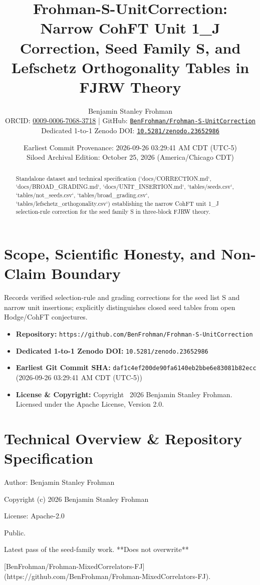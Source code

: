 \documentclass[11pt,a4paper]{article}
\title{\textbf{Frohman-S-UnitCorrection: Narrow CohFT Unit 1\_J Correction, Seed Family S, and Lefschetz Orthogonality Tables in FJRW Theory}}
\author{Benjamin Stanley Frohman\\
\small ORCID: \href{https://orcid.org/0009-0006-7068-3718}{0009-0006-7068-3718} \quad|\quad
GitHub: \href{https://github.com/BenFrohman/Frohman-S-UnitCorrection}{\texttt{BenFrohman/Frohman-S-UnitCorrection}}\\
\small Dedicated 1-to-1 Zenodo DOI: \href{https://doi.org/10.5281/zenodo.23652986}{\texttt{10.5281/zenodo.23652986}}}
\date{Earliest Commit Provenance: 2026-09-26 03:29:41 AM CDT (UTC-5)\\
Siloed Archival Edition: October 25, 2026 (America/Chicago CDT)}
\begin{document}
\maketitle

\begin{abstract}
Standalone dataset and technical specification (`docs/CORRECTION.md`, `docs/BROAD\_GRADING.md`, `docs/UNIT\_INSERTION.md`, `tables/seeds.csv`, `tables/not\_seeds.csv`, `tables/broad\_grading.csv`, `tables/lefschetz\_orthogonality.csv`) establishing the narrow CohFT unit 1\_J selection-rule correction for the seed family S in three-block FJRW theory.
\end{abstract}

\section{Scope, Scientific Honesty, and Non-Claim Boundary}
Records verified selection-rule and grading corrections for the seed list S and narrow unit insertions; explicitly distinguishes closed seed tables from open Hodge/CohFT conjectures.

\begin{itemize}
  \item \textbf{Repository:} \texttt{https://github.com/BenFrohman/Frohman-S-UnitCorrection}
  \item \textbf{Dedicated 1-to-1 Zenodo DOI:} \texttt{10.5281/zenodo.23652986}
  \item \textbf{Earliest Git Commit SHA:} \texttt{daf1c4ef200de90fa6140eb2bbe6e83081b82ecc} (2026-09-26 03:29:41 AM CDT (UTC-5))
  \item \textbf{License \& Copyright:} Copyright \textcopyright\ 2026 Benjamin Stanley Frohman. Licensed under the Apache License, Version 2.0.
\end{itemize}

\section{Technical Overview \& Repository Specification}
Author: Benjamin Stanley Frohman

Copyright (c) 2026 Benjamin Stanley Frohman

License: Apache-2.0

Public.

Latest pass of the seed-family work. **Does not overwrite**

[BenFrohman/Frohman-MixedCorrelators-FJ](https://github.com/BenFrohman/Frohman-MixedCorrelators-FJ).
\end{document}

